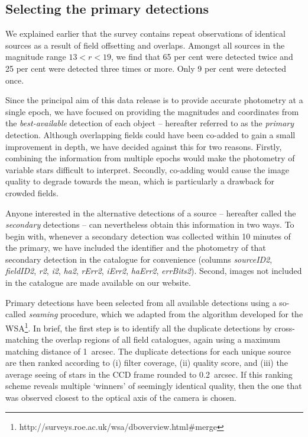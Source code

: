 \documentclass[a4paper,useAMS,usenatbib]{mn2e}
\begin{document}
\subsection{Selecting the primary detections}

We explained earlier that the survey contains repeat observations
of identical sources as a result of field offsetting and overlaps.
Amongst all sources in the magnitude range $13<r<19$,
we find that 65 per cent were detected twice
and 25 per cent were detected three times or more.
Only 9 per cent were detected once.

Since the principal aim of this data release is to provide 
accurate photometry at a single epoch,
we have focused on providing the magnitudes
and coordinates from the \emph{best-available} 
detection of each object -- 
hereafter referred to as the \emph{primary} detection.
Although overlapping fields could have been co-added 
to gain a small improvement in depth, 
we have decided against this for two reasons.
Firstly, combining the information from multiple epochs
would make the photometry of variable stars difficult to interpret.
Secondly, co-adding would cause the image quality to degrade towards the mean,
which is particularly a drawback for crowded fields.

Anyone interested in the alternative detections of a source
-- hereafter called the \emph{secondary} detections --
can nevertheless obtain this information in two ways.
To begin with, whenever a secondary detection was collected 
within 10 minutes of the primary,
we have included the identifier and the photometry
of that secondary detection
in the catalogue for convenience
(columns \emph{sourceID2}, \emph{fieldID2}, 
\emph{r2}, \emph{i2}, \emph{ha2},
\emph{rErr2}, \emph{iErr2}, \emph{haErr2}, \emph{errBits2}).
Second, images not included in the catalogue
are made available on our website.

Primary detections have been selected from all available detections using a so-called \emph{seaming} procedure,
which we adapted from the algorithm developed for the WSA\footnote{http://surveys.roe.ac.uk/wsa/dboverview.html\#merge}.
In brief, the first step is to identify all the duplicate detections
by cross-matching the overlap regions of all field catalogues,
again using a maximum matching distance of 1~arcsec.
The duplicate detections for each unique source are then ranked according to
(i) filter coverage, (ii) quality score,
and (iii) the average seeing of stars in the CCD frame rounded to 0.2~arcsec.
If this ranking scheme reveals multiple `winners' of seemingly identical quality,
then the one that was observed closest to the optical axis of the camera is chosen.
\end{document}
